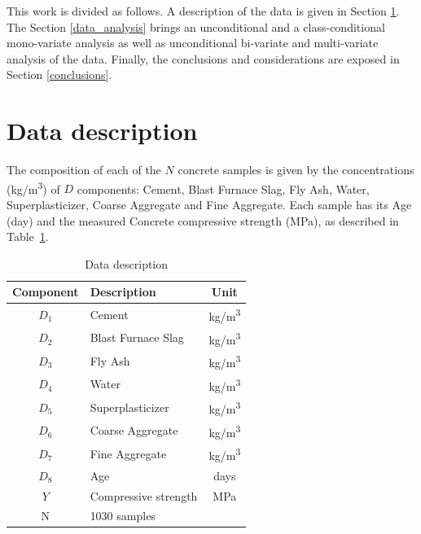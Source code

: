 \documentclass[conference]{IEEEtran}
\begin{document}
This work is divided as follows. {\color{red}A description of the data is given in Section \ref{data_description}. The Section \ref{data_analysis} brings an unconditional and a class-conditional mono-variate analysis as well as unconditional bi-variate and multi-variate analysis of the data. Finally, the conclusions and considerations are exposed in Section }\ref{conclusions}.


\section{Data description}\label{data_description}

The composition of each of the $N$ concrete samples is given by the concentrations (kg/m\textsuperscript{3}) of $D$ components: Cement, Blast Furnace Slag, Fly Ash, Water, Superplasticizer, Coarse Aggregate and Fine Aggregate. Each sample has its Age (day) and the measured Concrete compressive strength (MPa), as described in Table~\ref{data_description_table}.

\begin{table}[htp]
\caption{Data description}
\begin{center}
  \begin{tabular}{@{} clc @{}}
    \toprule
    Component & Description & Unit \\ 
    \midrule
    $D_1$ & Cement & kg/m\textsuperscript{3} \\ 
    $D_2$ & Blast Furnace Slag & kg/m\textsuperscript{3} \\ 
    $D_3$ & Fly Ash & kg/m\textsuperscript{3} \\ 
    $D_4$ & Water & kg/m\textsuperscript{3} \\ 
    $D_5$ & Superplasticizer & kg/m\textsuperscript{3} \\ 
    $D_6$ & Coarse Aggregate & kg/m\textsuperscript{3} \\ 
    $D_7$ & Fine Aggregate & kg/m\textsuperscript{3} \\ 
    $D_8$ & Age & days \\ 
    $Y$ & Compressive strength & MPa \\ 
	\midrule
    N & 1030 samples&  \\ 
    \bottomrule
  \end{tabular}
\end{center}
\label{data_description_table}
\end{table}%
\end{document}
